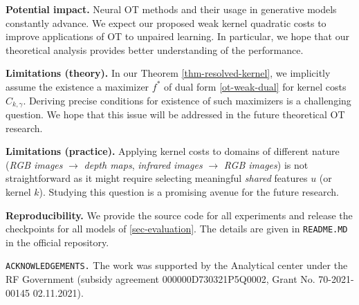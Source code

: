 \documentclass{article} %
\begin{document}
\vspace{-2mm}\textbf{Potential impact.} Neural OT methods and their usage in generative models constantly advance. We expect our proposed weak kernel quadratic costs to improve applications of OT to unpaired learning. In particular, we hope that our theoretical analysis provides better understanding of the performance. 

\textbf{Limitations (theory).} In our Theorem \ref{thm-resolved-kernel}, we implicitly assume the existence a maximizer $f^{*}$ of dual form \eqref{ot-weak-dual} for kernel costs $C_{k,\gamma}$. Deriving precise conditions for existence of such maximizers is a challenging question. We hope that this issue will be addressed in the future theoretical OT research.

\textbf{Limitations (practice).} Applying kernel costs to domains of different nature (\textit{RGB images} $\rightarrow$ \textit{depth maps}, \textit{infrared images} $\rightarrow$ \textit{RGB images}) is not straightforward as it might require selecting meaningful \textit{shared} features $u$ (or kernel $k$). Studying this question is a promising avenue for the future research.

\textbf{Reproducibility.} We provide the source code for all experiments and release the checkpoints for all models of \wasyparagraph\ref{sec-evaluation}. The details are given in \texttt{README.MD} in the official repository.

\texttt{ACKNOWLEDGEMENTS.} The work was supported by the Analytical center under the RF Government (subsidy agreement 000000D730321P5Q0002, Grant No. 70-2021-00145 02.11.2021).


% 
% 





\appendix



\end{document}
